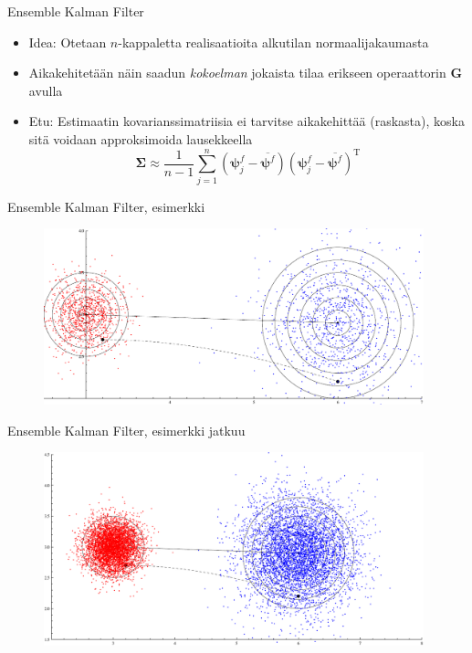 \documentclass{beamer}
\begin{document}
\begin{frame}{Ensemble Kalman Filter}

\begin{itemize}
\item Idea: Otetaan $n$-kappaletta realisaatioita alkutilan normaalijakaumasta
\item Aikakehitetään näin saadun \emph{kokoelman} jokaista tilaa erikseen operaattorin $\boldsymbol{G}$ avulla
\item Etu: Estimaatin kovarianssimatriisia ei tarvitse aikakehittää (raskasta), koska sitä voidaan approksimoida lausekkeella
\[
\boldsymbol{\Sigma} \approx \frac{1}{n-1} \sum_{j=1}^n \left( \boldsymbol{\psi}^f_j - \overline{\boldsymbol{\psi}^f} \right) \left(\boldsymbol{\psi}^f_j - \overline{\boldsymbol{\psi}^f}  \right)^\mathrm{T}
\]
\end{itemize}

\end{frame}

\begin{frame}{Ensemble Kalman Filter, esimerkki}

\begin{figure}
\includegraphics[width=11cm]{enkf3.pdf}
\end{figure}

\end{frame}

\begin{frame}{Ensemble Kalman Filter, esimerkki jatkuu}

\begin{figure}
\includegraphics[width=11cm]{enkf4.pdf}
\end{figure}

\end{frame}
\end{document}
